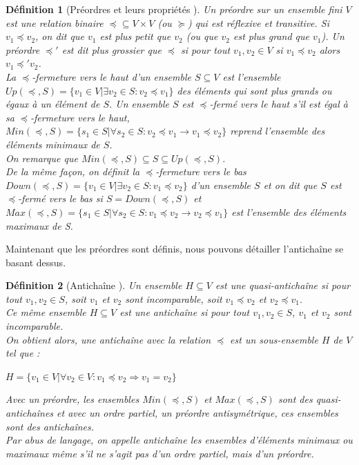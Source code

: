 \documentclass[a4paper]{report}
\theoremstyle{break}
\newtheorem{defin}{Définition}
\theoremstyle{breakplain}
\begin{document}
\begin{defin}[Préordres et leurs propriétés \cite{doyen2010antichain}]
Un préordre sur un ensemble fini $V$ est une relation binaire $\preceq \subseteq V \times V$ (ou $\succeq$) qui est réflexive et transitive. Si $v_1 \preceq v_2$, on dit que $v_1$ est plus petit que $v_2$ (ou que $v_2$ est plus grand que $v_1$).
Un préordre $\preceq'$ est dit plus grossier que $\preceq$ si pour tout $v_1, v_2 \in V$ si $v_1 \preceq v_2$ alors $v_1 \preceq' v_2$.\\
La $\preceq$-fermeture vers le haut d'un ensemble $S \subseteq V$ est l'ensemble $Up(\preceq, S) = \{ v_1 \in V | \exists v_2 \in S : v_2 \preceq v_1 \}$ des éléments qui sont plus grands ou égaux à un élément de $S$.
Un ensemble $S$ est $\preceq$-fermé vers le haut s'il est égal à sa $\preceq$-fermeture vers le haut, $Min(\preceq, S) = \{s_1 \in S | \forall s_2 \in S : v_2 \preceq v_1 \rightarrow v_1 \preceq v_2 \}$ reprend l'ensemble des éléments minimaux de $S$.\\
On remarque que $Min(\preceq, S) \subseteq S \subseteq Up(\preceq, S)$.\\

De la même façon, on définit la $\preceq$-fermeture vers le bas $Down(\preceq, S) = \{ v_1 \in V | \exists v_2 \in S : v_1 \preceq v_2 \}$ d'un ensemble $S$ et on dit que $S$ est $\preceq$-fermé vers le bas si $S = Down(\preceq, S)$ et $Max(\preceq, S) = \{s_1 \in S | \forall s_2 \in S : v_1 \preceq v_2 \rightarrow v_2 \preceq v_1 \}$ est l'ensemble des éléments maximaux de S.

\end{defin}

Maintenant que les préordres sont définis, nous pouvons détailler l'antichaîne se basant dessus.

\begin{defin}[Antichaîne \cite{doyen2010antichain}]
Un ensemble $H \subseteq V$ est une quasi-antichaîne si pour tout $v_1 , v_2 \in S$, soit $v_1$ et $v_2$ sont incomparable, soit $ v_1 \preceq v_2$ et $v_2 \preceq v_1$.\\
Ce même ensemble $H \subseteq V$ est une antichaîne si pour tout $v_1 , v_2 \in S$, $v_1$ et $v_2$ sont incomparable.\\
On obtient alors, une antichaîne avec la relation $\preceq$ est un sous-ensemble $H$ de $V$ tel que :
\begin{center}
$H = \{v_1 \in V|\forall v_2 \in V : v_1 \preceq v_2 \Rightarrow v_1 = v_2\}$
\end{center}

Avec un préordre, les ensembles $Min(\preceq, S)$ et $Max(\preceq, S)$ sont des quasi-antichaînes et avec un ordre partiel, un préordre antisymétrique, ces ensembles sont des antichaînes.\\
Par abus de langage, on appelle antichaîne les ensembles d'éléments minimaux ou maximaux même s'il ne s'agit pas d'un ordre partiel, mais d'un préordre.

\end{defin}
\end{document}
